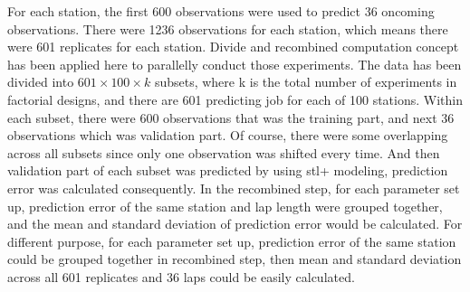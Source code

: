 For each station, the first 600 observations were used to predict 36 oncoming observations. There were 
1236 observations for each station, which means there were 601 replicates for each station. Divide and 
recombined computation concept has been applied here to parallelly conduct those experiments. The 
data has been divided into $601 \times 100 \times k$ subsets, where k is the total number of 
experiments in factorial designs, and there are 601 predicting job for each of 100 stations. Within
each subset, there were 600 observations that was the training part, and next 36 observations which
was validation part. Of course, there were some overlapping across all subsets since only one
observation was shifted every time. And then validation part of each subset was predicted by using 
stl+ modeling, prediction error was calculated consequently. In the recombined step, for each 
parameter set up, prediction error of the same station and lap length were grouped together, and the
mean and standard deviation of prediction error would be calculated. For different purpose, for each
parameter set up, prediction error of the same station could be grouped together in recombined step,
then mean and standard deviation across all 601 replicates and 36 laps could be easily calculated.
